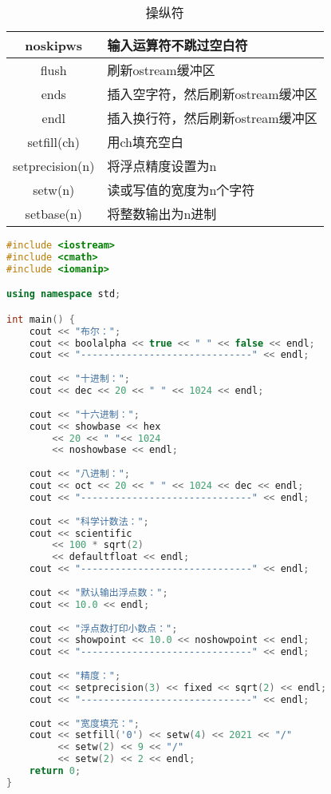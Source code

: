 \begin{table}[H]
{\begin{tabular}{|c|l|}
			\hline
			noskipws        & 输入运算符不跳过空白符                  \\
			\hline
			flush           & 刷新ostream缓冲区                       \\
			\hline
			ends            & 插入空字符，然后刷新ostream缓冲区       \\
			\hline
			endl            & 插入换行符，然后刷新ostream缓冲区       \\
			\hline
			setfill(ch)     & 用ch填充空白                            \\
			\hline
			setprecision(n) & 将浮点精度设置为n                       \\
			\hline
			setw(n)         & 读或写值的宽度为n个字符                 \\
			\hline
			setbase(n)      & 将整数输出为n进制                       \\
			\hline
		\end{tabular}
	}
	\caption{操纵符}
\end{table}


\begin{lstlisting}[language=C++]
#include <iostream>
#include <cmath>
#include <iomanip>

using namespace std;

int main() {
    cout << "布尔：";
    cout << boolalpha << true << " " << false << endl;
    cout << "------------------------------" << endl;
    
    cout << "十进制：";
    cout << dec << 20 << " " << 1024 << endl;
    
    cout << "十六进制：";
    cout << showbase << hex 
        << 20 << " "<< 1024
        << noshowbase << endl;
    
    cout << "八进制：";
    cout << oct << 20 << " " << 1024 << dec << endl;
    cout << "------------------------------" << endl;
    
    cout << "科学计数法：";
    cout << scientific
        << 100 * sqrt(2)
        << defaultfloat << endl;
    cout << "------------------------------" << endl;
    
    cout << "默认输出浮点数：";
    cout << 10.0 << endl;
    
    cout << "浮点数打印小数点：";
    cout << showpoint << 10.0 << noshowpoint << endl;
    cout << "------------------------------" << endl;
    
    cout << "精度：";
    cout << setprecision(3) << fixed << sqrt(2) << endl;
    cout << "------------------------------" << endl;
    
    cout << "宽度填充：";
    cout << setfill('0') << setw(4) << 2021 << "/"
         << setw(2) << 9 << "/"
         << setw(2) << 2 << endl;
    return 0;
}
\end{lstlisting}

